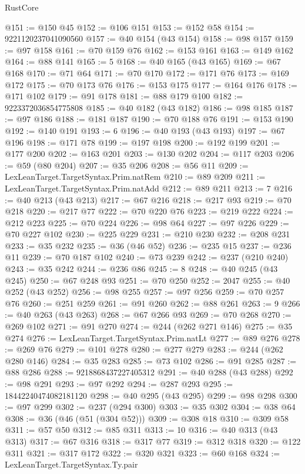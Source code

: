 \begin{lexlean}{RustCore}
\begin{coremodule}
@151 := @150 @45
@152 := @106 @151
@153 := @152 @58
@154 := 9221120237041090560
@157 := @40 @154 (@43 @154)
@158 := @98 @157
@159 := @97 @158
@161 := @70 @159 @76
@162 := @153 @161
@163 := @149 @162
@164 := @88 @141
@165 := 5
@168 := @40 @165 (@43 @165)
@169 := @67 @168
@170 := @71 @64
@171 := @70 @170
@172 := @171 @76
@173 := @169 @172
@175 := @70 @173 @76
@176 := @153 @175
@177 := @164 @176
@178 := @171 @102
@179 := @91 @178
@181 := @88 @179 @100
@182 := 9223372036854775808
@185 := @40 @182 (@43 @182)
@186 := @98 @185
@187 := @97 @186
@188 := @181 @187
@190 := @70 @188 @76
@191 := @153 @190
@192 := @140 @191
@193 := 6
@196 := @40 @193 (@43 @193)
@197 := @67 @196
@198 := @171 @78
@199 := @197 @198
@200 := @192 @199
@201 := @177 @200
@202 := @163 @201
@203 := @130 @202
@204 := @117 @203
@206 := @59 (@80 @204)
@207 := @35 @206
@208 := @56 @11
@209 := LexLeanTarget.TargetSyntax.Prim.natRem
@210 := @89 @209
@211 := LexLeanTarget.TargetSyntax.Prim.natAdd
@212 := @89 @211
@213 := 7
@216 := @40 @213 (@43 @213)
@217 := @67 @216
@218 := @217 @93
@219 := @70 @218
@220 := @217 @77
@222 := @70 @220 @76
@223 := @219 @222
@224 := @212 @223
@225 := @70 @224
@226 := @98 @64
@227 := @97 @226
@229 := @70 @227 @102
@230 := @225 @229
@231 := @210 @230
@232 := @208 @231
@233 := @35 @232
@235 := @36 (@46 @52)
@236 := @235 @15
@237 := @236 @11
@239 := @70 @187 @102
@240 := @73 @239
@242 := @237 (@210 @240)
@243 := @35 @242
@244 := @236 @86
@245 := 8
@248 := @40 @245 (@43 @245)
@250 := @67 @248 @93
@251 := @70 @250
@252 := 2047
@255 := @40 @252 (@43 @252)
@256 := @98 @255
@257 := @97 @256
@259 := @70 @257 @76
@260 := @251 @259
@261 := @91 @260
@262 := @88 @261
@263 := 9
@266 := @40 @263 (@43 @263)
@268 := @67 @266 @93
@269 := @70 @268
@270 := @269 @102
@271 := @91 @270
@274 := @244 (@262 @271 @146)
@275 := @35 @274
@276 := LexLeanTarget.TargetSyntax.Prim.natLt
@277 := @89 @276
@278 := @269 @76
@279 := @101 @278
@280 := @277 @279
@283 := @244 (@262 @280 @146)
@284 := @35 @283
@285 := @73 @102
@286 := @91 @285
@287 := @88 @286
@288 := 9218868437227405312
@291 := @40 @288 (@43 @288)
@292 := @98 @291
@293 := @97 @292
@294 := @287 @293
@295 := 18442240474082181120
@298 := @40 @295 (@43 @295)
@299 := @98 @298
@300 := @97 @299
@302 := @237 (@294 @300)
@303 := @35 @302
@304 := @38 @64
@308 := @36 (@46 (@51 (@304 @52)))
@309 := @308 @18
@310 := @309 @58
@311 := @57 @50
@312 := @85 @311
@313 := 10
@316 := @40 @313 (@43 @313)
@317 := @67 @316
@318 := @317 @77
@319 := @312 @318
@320 := @122 @311
@321 := @317 @172
@322 := @320 @321
@323 := @60 @168
@324 := LexLeanTarget.TargetSyntax.Ty.pair

\end{coremodule}
\end{lexlean}
